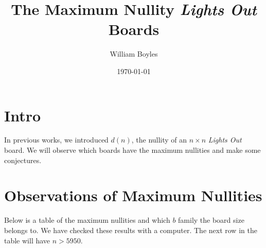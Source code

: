 \documentclass{article}
\begin{document}
	\title{The Maximum Nullity \textit{Lights Out} Boards}
	\author{William Boyles}
	\date{\today}
	\maketitle
	
	\section{Intro}
	In previous works, we introduced $d(n)$, the nullity of an $n \times n$ \textit{Lights Out} board.
	We will observe which boards have the maximum nullities and make some conjectures.
	
	\section{Observations of Maximum Nullities}
	Below is a table of the maximum nullities and which $b$ family the board size belongs to.
	We have checked these results with a computer.
	The next row in the table will have $n > 5950$.
\end{document}
